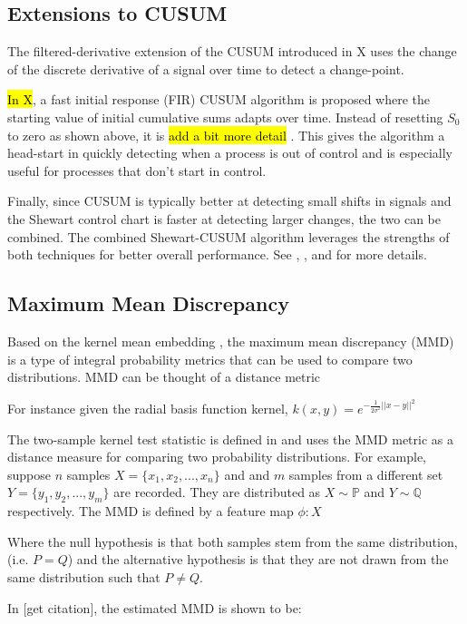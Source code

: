 \subsection{Extensions to CUSUM}
The filtered-derivative extension of the CUSUM introduced in X uses the change of the discrete derivative of a signal over time to detect a change-point. 

\hl{In X}, a fast initial response (FIR) CUSUM algorithm is proposed where the starting value of initial cumulative sums adapts over time. Instead of resetting $S_0$ to zero as shown above, it is \hl{add a bit more detail} . This gives the algorithm a head-start in quickly detecting when a process is out of control and is especially useful for processes that don't start in control.

Finally, since CUSUM is typically better at detecting small shifts in signals and the Shewart control chart is faster at detecting larger changes, the two can be combined. The combined Shewart-CUSUM algorithm leverages the strengths of both techniques for better overall performance. See \cite{lucas1982combined}, \cite{yashchin1985analysis}, and \cite{westgard1977combined} for more details. 

\subsection{Maximum Mean Discrepancy}
Based on the kernel mean embedding , the maximum mean discrepancy (MMD) is a type of integral probability metrics that can be used to compare two distributions. MMD can be thought of a distance metric

For instance given the radial basis function kernel, $k(x, y)= e^{-\frac{1}{2\sigma^2}||x-y||^2}$

The two-sample kernel test statistic is defined in \cite{gretton2012kernel} and uses the MMD metric as a distance measure for comparing two probability distributions. For example, suppose $n$ samples $X = \{x_1, x_2, ..., x_n\}$ and and $m$ samples from a different set $Y=\{y_1, y_2, ..., y_m\}$ are recorded. They are distributed as $X \sim  \mathbb{P}$ and $Y \sim \mathbb{Q}$ respectively. The MMD is defined by a feature map $\phi: X$

Where the null hypothesis is that both samples stem from the same distribution,  (i.e. $P = Q$) and the alternative hypothesis is that they are not drawn from the same distribution such that $P \neq Q$.

In [get citation], the estimated MMD is shown to be:

